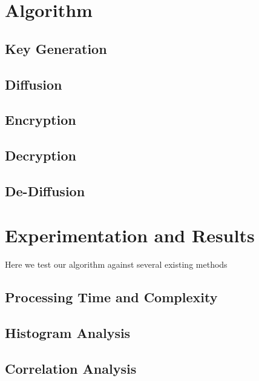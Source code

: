 \documentclass[conference]{IEEEtran}
\begin{document}
\section{Algorithm}\label{sec:algorithm}

\subsection{Key Generation}\label{subsec:key-generation}

\subsection{Diffusion}\label{subsec:diffusion}

\subsection{Encryption}\label{subsec:encryption}

\subsection{Decryption}\label{subsec:decryption}

\subsection{De-Diffusion}\label{subsec:de-diffusion}

\section{Experimentation and Results}\label{sec:experimentation-and-results}

Here we test our algorithm against several existing methods

\subsection{Processing Time and Complexity}\label{subsec:processing-time-and-complexity}

\subsection{Histogram Analysis}\label{subsec:histogram-analysis}

\subsection{Correlation Analysis}\label{subsec:correlation-analysis}
\end{document}
